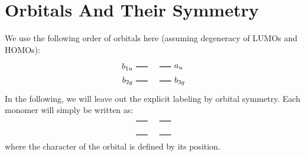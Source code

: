 \documentclass{article}
\begin{document}
    \pagestyle{empty}
    \tableofcontents 
    \newpage 
    \section{Orbitals And Their Symmetry}%

\vspace{2cm}
We use the following order of orbitals here (assuming degeneracy of LUMOs and HOMOs): 
$$
\begin{tikzpicture}[baseline={(current bounding box.center)}]
            \draw[thick] (0,0) -- (0.5,0)
                node[pos=0, left] {$b_{1u}$}
                ;
            \draw[thick] (1,0) -- (1.5,0)
                node[pos=1, right] {$a_{u}$}
                ;
            \draw[thick] (0,-0.6) -- (0.5,-0.6)
                node[pos=0, left] {$b_{2g}$}
                ;
            \draw[thick] (1,-0.6) -- (1.5,-0.6)
                node[pos=1, right] {$b_{3g}$}
                ;
        
\end{tikzpicture}
$$
In the following, we will leave out the explicit labeling by orbital symmetry. Each monomer will simply be written as:
$$
\begin{tikzpicture}[baseline={(current bounding box.center)}]
            \draw[thick] (0,0) -- (0.5,0)
                ;
            \draw[thick] (1,0) -- (1.5,0)
                ;
            \draw[thick] (0,-0.6) -- (0.5,-0.6)
                ;
            \draw[thick] (1,-0.6) -- (1.5,-0.6)
                ;
        
\end{tikzpicture}
$$
where the character of the orbital is defined by its position. 
\end{document}
